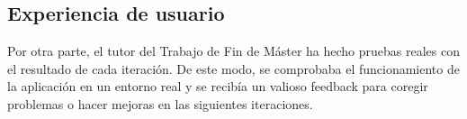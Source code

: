 \subsection{Experiencia de usuario}
\label{subsec:2.1.3}

Por otra parte, el tutor del Trabajo de Fin de Máster ha hecho pruebas reales con el resultado de cada iteración. De este modo, se comprobaba el funcionamiento de la aplicación en un entorno real y se recibía un valioso feedback para coregir problemas o hacer mejoras en las siguientes iteraciones.
